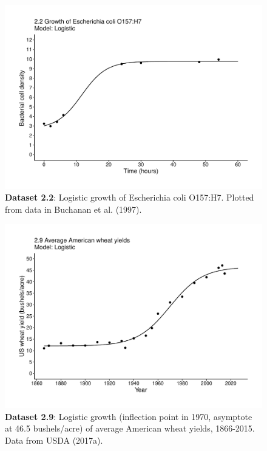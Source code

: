 \documentclass[aps,rmp,preprint,superscriptaddress,10pt,onecolumn]{article}
\begin{document}
\clearpage
\begin{figure}[h]
\includegraphics[width=\textwidth]{output/figs-ggplot/2.2.pdf}
\caption{\textbf{Dataset 2.2}: Logistic growth of Escherichia coli O157:H7. Plotted from data in Buchanan et al. (1997).}
\end{figure}
	
\clearpage
\begin{figure}[h]
\includegraphics[width=\textwidth]{output/figs-ggplot/2.9.pdf}
\caption{\textbf{Dataset 2.9}: Logistic growth (inflection point in 1970, asymptote at 46.5 bushels/acre) of average American wheat yields, 1866-2015. Data from USDA (2017a).}
\end{figure}
	
\end{document}
